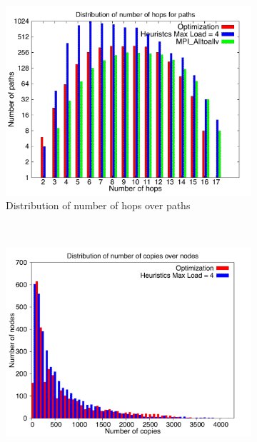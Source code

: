 \begin{figure}[!htbp]
        \centering
        \begin{subfigure}[b]{0.49\textwidth}
                \includegraphics[width=\textwidth]{report_figures/constantr/3_4096/hop_histo.pdf}
                \caption{Distribution of number of hops over paths}
                \label{fig:3_4096_hop}
        \end{subfigure}%
        ~ %
        \begin{subfigure}[b]{0.49\textwidth}
                \includegraphics[width=\textwidth]{report_figures/constantr/3_4096/copy_histo.pdf}

\end{subfigure}
\end{figure}
